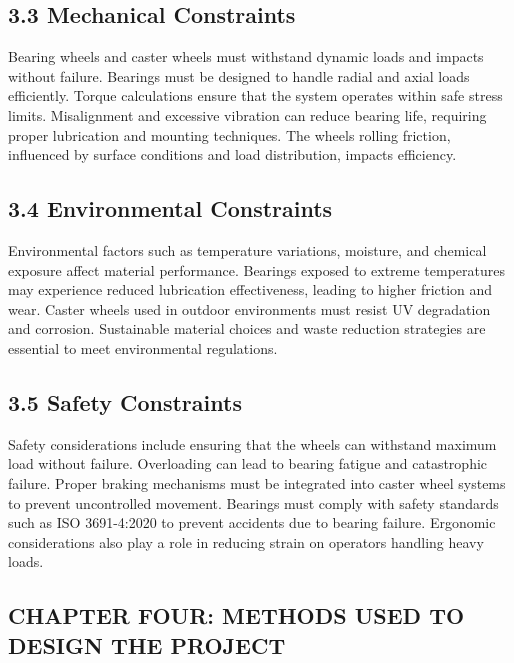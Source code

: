 \documentclass[../../main]{subfiles}
\begin{document}
\subsection{3.3 Mechanical Constraints}\label{mechanical-constraints}

Bearing wheels and caster wheels must withstand dynamic loads and
impacts without failure. Bearings must be designed to handle radial and
axial loads efficiently. Torque calculations ensure that the system
operates within safe stress limits. Misalignment and excessive vibration
can reduce bearing life, requiring proper lubrication and mounting
techniques. The wheel\textquotesingle s rolling friction, influenced by
surface conditions and load distribution, impacts efficiency.

\subsection{3.4 Environmental
Constraints}\label{environmental-constraints}

Environmental factors such as temperature variations, moisture, and
chemical exposure affect material performance. Bearings exposed to
extreme temperatures may experience reduced lubrication effectiveness,
leading to higher friction and wear. Caster wheels used in outdoor
environments must resist UV degradation and corrosion. Sustainable
material choices and waste reduction strategies are essential to meet
environmental regulations.

\subsection{3.5 Safety Constraints}\label{safety-constraints}

Safety considerations include ensuring that the wheels can withstand
maximum load without failure. Overloading can lead to bearing fatigue
and catastrophic failure. Proper braking mechanisms must be integrated
into caster wheel systems to prevent uncontrolled movement. Bearings
must comply with safety standards such as ISO 3691-4:2020 to prevent
accidents due to bearing failure. Ergonomic considerations also play a
role in reducing strain on operators handling heavy loads.

\subsection{\texorpdfstring{\textbf{CHAPTER FOUR: METHODS USED TO DESIGN
THE
PROJECT}}{CHAPTER FOUR: METHODS USED TO DESIGN THE PROJECT}}\label{chapter-four-methods-used-to-design-the-project}
\end{document}
